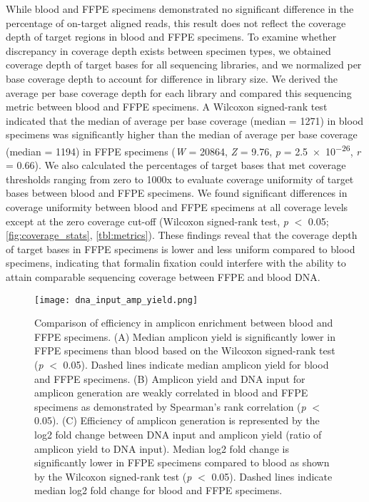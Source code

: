 While blood and FFPE specimens demonstrated no significant difference in the percentage of on-target aligned reads, this result does not reflect the coverage depth of target regions in blood and FFPE specimens. To examine whether discrepancy in coverage depth exists between specimen types, we obtained coverage depth of target bases for all sequencing libraries, and we normalized per base coverage depth to account for difference in library size. We derived the average per base coverage depth for each library and compared this sequencing metric between blood and FFPE specimens. A Wilcoxon signed-rank test indicated that the median of average per base coverage (median = 1271) in blood specimens was significantly higher than the median of average per base coverage (median = 1194) in FFPE specimens (\textit{W} = \num{20864}, \textit{Z} = 9.76, \textit{p} = \num{2.5e-26}, \textit{r} = 0.66). We also calculated the percentages of target bases that met coverage thresholds ranging from zero to 1000x to evaluate coverage uniformity of target bases between blood and FFPE specimens. We found significant differences in coverage uniformity between blood and FFPE specimens at all coverage levels except at the zero coverage cut-off (Wilcoxon signed-rank test, \textit{p} $<$ \num{0.05}; \autoref{fig:coverage_stats}, \autoref{tbl:metrics}). These findings reveal that the coverage depth of target bases in FFPE specimens is lower and less uniform compared to blood specimens, indicating that formalin fixation could interfere with the ability to attain comparable sequencing coverage between FFPE and blood DNA.


\begin{figure}[H]
	\centering
	\texttt{[image: dna\_input\_amp\_yield.png]}
	\caption{Comparison of efficiency in amplicon enrichment between blood and FFPE specimens. (A) Median amplicon yield is significantly lower in FFPE specimens than blood based on the Wilcoxon signed-rank test (\textit{p} $<$ 0.05). Dashed lines indicate median amplicon yield for blood and FFPE specimens. (B) Amplicon yield and DNA input for amplicon generation are weakly correlated in blood and FFPE specimens as demonstrated by Spearman's rank correlation (\textit{p} $<$ 0.05). (C) Efficiency of amplicon generation is represented by the log2 fold change between DNA input and amplicon yield (ratio of amplicon yield to DNA input). Median log2 fold change is significantly lower in FFPE specimens compared to blood as shown by the Wilcoxon signed-rank test (\textit{p} $<$ 0.05). Dashed lines indicate median log2 fold change for blood and FFPE specimens.}
	\label{fig:dna_input_amp_yield}
\end{figure}

